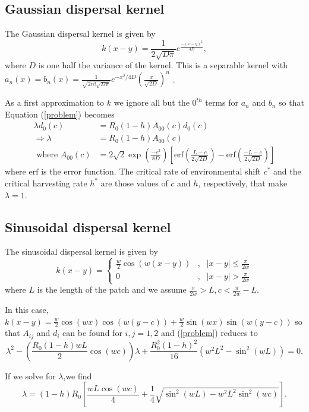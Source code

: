 \documentclass[12pt,english]{article}
\begin{document}
\subsection{Gaussian dispersal kernel \label{gausapp}}
The Gaussian dispersal kernel is given by
$$k(x-y)=\frac{1}{2\sqrt{D\pi}}e^{\frac{-(x-y)^2}{4D}},$$
where $D$ is one half the variance of the kernel.
This is a separable kernel with
$a_n(x)=b_n(x)=\frac{1}{\sqrt{2n!\sqrt{D\pi}}}e^{-x^2/4D}\left(\frac{x}{\sqrt{2D}}\right)^n$ \citep{Latore:1998fk}.

As a first approximation to $k$ we ignore all but the $0^{th}$ terms for $a_n$ and $b_n$ so that Equation (\ref{problem}) becomes
\begin{align*}
\lambda d_0(c)&=R_0(1-h)A_{00}(c)d_0(c)
\\ \Rightarrow \lambda&=R_0(1-h)A_{00}(c)
\\\text{ where } A_{00}(c)&=2\sqrt{2}\exp\left(\frac{-c^2}{8D}\right)\left[\text{erf}\left(\frac{L-c}{2\sqrt{2D}}\right)-\text{erf}\left(\frac{-L-c}{2\sqrt{2D}}\right)\right]
\end{align*}
where $\text{erf}$ is the error function.  The critical rate of environmental shift $c^*$ and the critical harvesting rate $h^*$ are those values of $c$ and $h$, respectively, that make $\lambda=1$.

\subsection{Sinusoidal dispersal kernel \label{sinapp}}
The sinusoidal dispersal kernel is given by 
$$k(x-y)=\left\{\begin{array}{ccccc}
\frac{w}{2}\cos(w(x-y)) & , & |x-y|\leq\frac{\pi}{2w}
\\ 0 & , & |x-y|>\frac{\pi}{2w}
\end{array}\right.
$$
where $L$ is the length of the patch and we assume $\frac{\pi}{2w}>L,c<\frac{\pi}{2w}-L$.

In this case, $k(x-y)=\frac{w}{2}\cos(wx)\cos(w(y-c))+\frac{w}{2}\sin(wx)\sin(w(y-c))$ so that $A_{ij}$ and $d_i$ can be found for $i,j=1,2$ and (\ref{problem}) reduces to 
$$\lambda^2-\left(\frac{R_0(1-h)wL}{2}\cos(wc)\right)\lambda+\frac{R_0^2(1-h)^2}{16}\left(w^2L^2-\sin^2(wL)\right)=0.$$

If we solve for $\lambda$,we find
\begin{equation*} \lambda=(1-h)R_0\left[\frac{wL\cos(wc)}{4}+\frac{1}{4}\sqrt{\sin^2(wL)-w^2L^2\sin^2(wc)}\right]. \label{cosine} \end{equation*}
\end{document}

